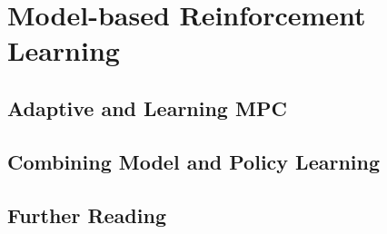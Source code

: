 \chapter{Model-based Reinforcement Learning}

\section{Adaptive and Learning MPC}











\section{Combining Model and Policy Learning}




\section{Further Reading}

